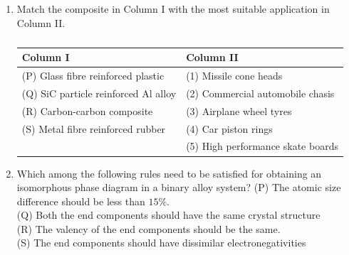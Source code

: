 \documentclass[a4paper,10pt]{article}
\begin{document}
\begin{enumerate}
    \item Match the composite in Column I with the most suitable application in Column II.
    \begin{table}[h!] \centering \caption*{} \label{tab:q15_material}
        \begin{tabular}{ll} \hline
            \textbf{Column I} & \textbf{Column II} \\ \hline
            (P) Glass fibre reinforced plastic & (1) Missile cone heads \\
            (Q) SiC particle reinforced Al alloy & (2) Commercial automobile chasis \\
            (R) Carbon-carbon composite & (3) Airplane wheel tyres \\
            (S) Metal fibre reinforced rubber & (4) Car piston rings \\
            & (5) High performance skate boards \\ \hline
        \end{tabular}
    \end{table}
    
    \hfill{}
    \begin{enumerate}[label=\Alph*)]
    \end{enumerate}
    
    \item Which among the following rules need to be satisfied for obtaining an isomorphous phase diagram in a binary alloy system?
    (P) The atomic size difference should be less than $15\%$. \\
    (Q) Both the end components should have the same crystal structure \\
    (R) The valency of the end components should be the same. \\
    (S) The end components should have dissimilar electronegativities
    
    \hfill{}
    \begin{enumerate}[label=\Alph*)]
    \end{enumerate}
    

\end{enumerate}
\end{document}
